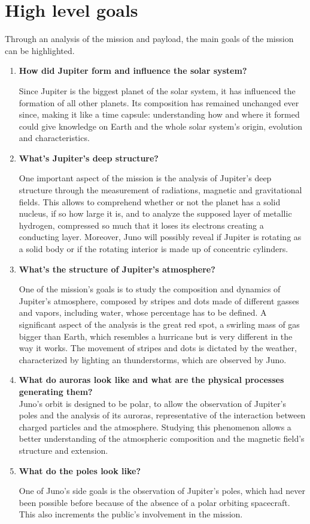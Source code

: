 \section{High level goals}
\label{sec:goals}

Through an analysis of the mission and payload, the main goals of the mission can be highlighted. 

\begin{enumerate}
    \item \textbf{How did Jupiter form and influence the solar system?} \cite{2006_overview} \cite{video_1h}
    
    Since Jupiter is the biggest planet of the solar system, it has influenced the formation of all other planets. Its composition has remained unchanged ever since, making it like a time capsule: understanding how and where it formed could give knowledge on Earth and the whole solar system’s origin, evolution and characteristics. 
    \item \textbf{What's Jupiter's deep structure?} \cite {Overview_Juno} \cite{video_1h}
    
    One important aspect of the mission is the analysis of Jupiter's deep structure through the measurement of radiations, magnetic and gravitational fields. This allows to comprehend whether or not the planet has a solid nucleus, if so how large it is, and to analyze the supposed layer of metallic hydrogen, compressed so much that it loses its electrons creating a conducting layer.  Moreover, Juno will possibly reveal if Jupiter is rotating as a solid body or if the rotating interior is made up of concentric cylinders. %
    \item \textbf{What's the structure of Jupiter's atmosphere?}  \cite{Juno_mission}\cite{video_1h}

    One of the mission's goals is to study the composition and dynamics of Jupiter's atmosphere, composed by stripes and dots made of different gasses and vapors, including water, whose percentage has to be defined. A significant aspect of the analysis is the great red spot, a swirling mass of gas bigger than Earth, which resembles a hurricane but is very different in the way it works. The movement of stripes and dots is dictated by the weather, characterized by lighting an thunderstorms, which are observed by Juno. 
    \item \textbf{What do auroras look like and what are the physical processes generating them?}  \cite{Juno_mission} \cite{video_1h}\\ %
    Juno's orbit is designed to be polar, to allow the observation of Jupiter's poles and the analysis of its auroras, representative of the interaction between charged particles and the atmosphere. Studying this phenomenon allows a better understanding of the atmospheric composition and the magnetic field's structure and extension.
    \item \textbf{What do the poles look like?} \cite{video_1h}
    \label{goal 5}
    
    One of Juno's side goals is the observation of Jupiter's poles, which had never been possible before because of the absence of a polar orbiting spacecraft. This also increments the public's involvement in the mission.

\end{enumerate}